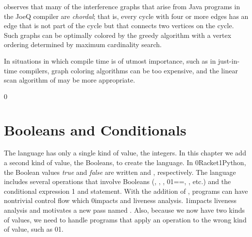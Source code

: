 \documentclass[7x10]{TimesAPriori_MIT}%
\def\racketEd{0}
\def\pythonEd{1}
\def\edition{1}
\newcommand{\racket}[1]{{\if\edition\racketEd{#1}\fi}}
\newcommand{\pythonColor}[0]{}
\newcommand{\python}[1]{{\if\edition\pythonEd\pythonColor #1\fi}}
\numberwithin{theorem}{chapter}
\numberwithin{definition}{chapter}
\numberwithin{equation}{chapter}
\begin{document}


\citet{Palsberg:2007si} observes that many of the interference graphs
that arise from Java programs in the JoeQ compiler are \emph{chordal};
that is, every cycle with four or more edges has an edge that is not
part of the cycle but that connects two vertices on the cycle. Such
graphs can be optimally colored by the greedy algorithm with a vertex
ordering determined by maximum cardinality search.

In situations in which compile time is of utmost importance, such as
in just-in-time compilers, graph coloring algorithms can be too
expensive, and the linear scan algorithm of \citet{Poletto:1999uq} may
be more appropriate.


{\if\edition\racketEd
{}
\fi}
\chapter{Booleans and Conditionals}
\label{ch:Lif}
\setcounter{footnote}{0}

The \LangVar{} language has only a single kind of value, the
integers. In this chapter we add a second kind of value, the Booleans,
to create the \LangIf{} language. In \racket{Racket}\python{Python},
the Boolean values \emph{true} and \emph{false}
are written
\TRUE{} and
\FALSE{}, respectively.  The \LangIf{}
language includes several operations that involve Booleans
(,
,
,
\racket{}\python{==},
\key{<}, etc.) and the
conditional expression
\python{ and statement}.
With the addition of , programs can have
nontrivial control flow which
%
\racket{impacts  and liveness analysis.}
%
\python{impacts liveness analysis and motivates a new pass named
  \code{explicate\_control}.}%
%
Also, because we now have two kinds of values, we need to handle
programs that apply an operation to the wrong kind of value, such as
\racket{}\python{}.
\end{document}
